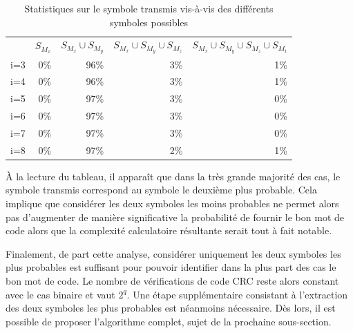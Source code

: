 \begin{table}[!tb]
    \centering
    \caption{Statistiques sur le symbole transmis vis-à-vis des différents symboles possibles}
    \label{tab:symb}
        \begin{tabular}{lrrrr}
            \toprule
            		& $S_{M_x}$	& $S_{M_x}\cup S_{M_y}$	& $S_{M_x}\cup S_{M_y}\cup S_{M_z}$ & $S_{M_x}\cup S_{M_y}\cup S_{M_z}\cup S_{M_t}$ \\
            \cmidrule(l){2-2}\cmidrule(l){3-3}\cmidrule(l){4-4}\cmidrule(l){5-5}
            i=3     &	0\%		&	96\%	& 	3\%		&	1\%		\\
            i=4     &	0\%		&	96\%	& 	3\%		&	1\%		\\
            i=5     &	0\%		&	97\%	& 	3\%		&	0\%		\\
            i=6     &	0\%		&	97\%	& 	3\%		&	0\%		\\
            i=7     &	0\%		&	97\%	& 	3\%		&	0\%		\\
            i=8     &	0\%		&	97\%	& 	2\%		&	1\%	\\
            \bottomrule
        \end{tabular}%
\end{table}
 
À la lecture du tableau, il apparaît que dans la très grande majorité des cas, le symbole transmis 
correspond au symbole le deuxième plus probable. Cela implique que considérer les deux symboles les moins probables ne 
permet alors pas d'augmenter de manière significative la probabilité de fournir le bon mot de code alors que la complexité 
calculatoire résultante serait tout à fait notable.

Finalement, de part cette analyse, considérer uniquement les deux symboles les plus probables est suffisant pour 
pouvoir identifier dans la plus part des cas le bon mot de code. Le nombre de vérifications de code CRC reste alors 
constant avec le cas binaire et vaut $2^q$. Une étape supplémentaire consistant à l'extraction des deux symboles les plus probables est néanmoins 
nécessaire. Dès lors, il est possible de proposer l'algorithme complet, sujet de la prochaine sous-section.

